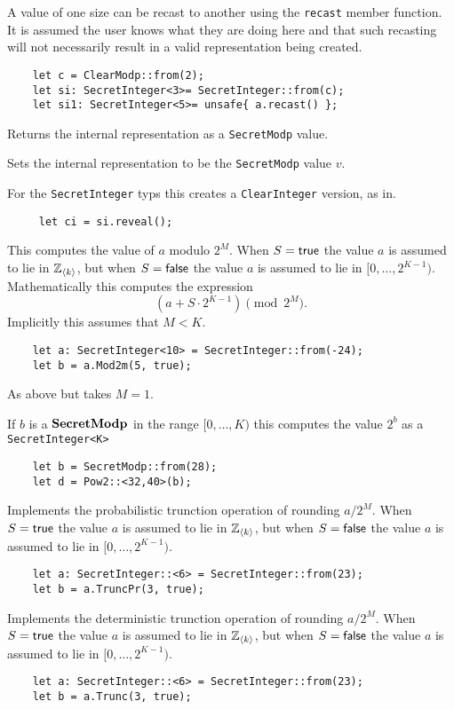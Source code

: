 A value of one size can be recast to another using the \verb|recast|
member function. It is assumed the user knows what they are doing here
and that such recasting will not necessarily result in a valid representation
being created.
\begin{lstlisting}
    let c = ClearModp::from(2);
    let si: SecretInteger<3>= SecretInteger::from(c);
    let si1: SecretInteger<5>= unsafe{ a.recast() };
\end{lstlisting}

Returns the internal representation as a \verb|SecretModp| value.

Sets the internal representation to be the \verb|SecretModp| value $v$.

For the \verb|SecretInteger| typs this creates a \verb|ClearInteger| version, as in.
\begin{lstlisting}
     let ci = si.reveal();
\end{lstlisting}

This computes the value of $a$ modulo $2^M$.
When $S={\mathsf{true}}$ the value $a$ is assumed to lie in ${\mathbb{Z}}_{\langle k \rangle}$,
but when $S={\mathsf{false}}$ the value $a$ is assumed to lie in $[0,\ldots,2^{K-1})$.
Mathematically this computes the expression
\[  \left( a + S \cdot 2^{K-1} \right) \pmod 2^M. \]
Implicitly this assumes that $M < K$.
\begin{lstlisting}
    let a: SecretInteger<10> = SecretInteger::from(-24);
    let b = a.Mod2m(5, true);
\end{lstlisting}

As above but takes $M=1$.

If $b$ is a $\mathbf{SecretModp}$ in the range $[0,\ldots,K)$ this computes
the value $2^b$ as a \verb|SecretInteger<K>|
\begin{lstlisting}
    let b = SecretModp::from(28);
    let d = Pow2::<32,40>(b);
\end{lstlisting}

Implements the probabilistic trunction operation of rounding $a/2^M$.
When $S={\mathsf{true}}$ the value $a$ is assumed to lie in ${\mathbb{Z}}_{\langle k \rangle}$,
but when $S={\mathsf{false}}$ the value $a$ is assumed to lie in $[0,\ldots,2^{K-1})$.
\begin{lstlisting}
    let a: SecretInteger::<6> = SecretInteger::from(23);
    let b = a.TruncPr(3, true);
\end{lstlisting}

Implements the deterministic trunction operation of rounding $a/2^M$.
When $S={\mathsf{true}}$ the value $a$ is assumed to lie in ${\mathbb{Z}}_{\langle k \rangle}$,
but when $S={\mathsf{false}}$ the value $a$ is assumed to lie in $[0,\ldots,2^{K-1})$.
\begin{lstlisting}
    let a: SecretInteger::<6> = SecretInteger::from(23);
    let b = a.Trunc(3, true);
\end{lstlisting}

